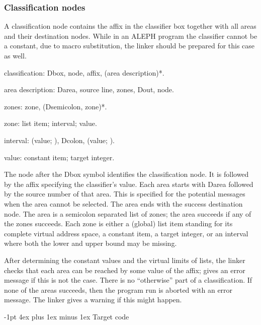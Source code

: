 \documentclass[titlepage]{article}
\makeatletter
\newcommand\A{\textsf{ALEPH}}
\newenvironment{grammar}{%
\begin{list}{}{%
\setlength\leftmargin{18pt}%
\setlength\rightmargin{-5pt}%
\setlength\listparindent{20pt}%
\setlength\itemsep{1pt plus0.2ex}%
\setlength\parsep{0pt plus 2pt}%
\setlength\labelsep{-5pt}%
}\color{blue!90!black}\sf\mkoptions%
}{\end{list}}
\newcommand\g[1]{\textsf{\color{blue!90!black}#1}}
\renewcommand\section{%
\newpage
\@startsection{section}{1}{\z@}%
   {-1pt}%
   {4ex plus 1ex minus 1ex}%
   {\normalfont\Large\bfseries}}
\let\osection\section
\def\section {\newpage\osection}
\makeatother
\begin{document}
\subsubsection{Classification nodes}

A classification node contains the affix in the classifier box together with
all areas and their destination nodes. While in an \A{} program the classifier
cannot be a constant, due to macro substitution, the linker should be prepared
for this case as well.
\begin{grammar}
\item classification: Dbox, node, affix, (area description)*.
\item area description: Darea, source line, zones, Dout, node.
\item zones: zone, (Dsemicolon, zone)*.
\item zone: list item; interval; value.
\item interval: (value; ), Dcolon, (value; ).
\item value: constant item; target integer.
\end{grammar}
The \g{node} after the \g{Dbox} symbol identifies the classification node.
It is followed by the affix specifying the classifier's value. Each area
starts with \g{Darea} followed by the source number of that area. This is
specified for the potential messages when the area cannot be selected. The
area ends with the success destination node. The area is a semicolon
separated list of \g{zone}s; the area succeeds if any of the zones succeeds.
Each \g{zone} is either a (global) list item standing for its complete
virtual address space, a constant item, a target integer, or an \g{interval}
where both the lower and upper bound may be missing.

After determining the constant values and the virtual limits of lists, the
linker checks that each area can be reached by some value of the \g{affix};
gives an error message if this is not the case. There is no
``otherwise'' part of a classification. If none of the areas succeeds, then
the program run is aborted with an error message. The linker gives a warning
if this might happen.





\section{Target code}
\end{document}
